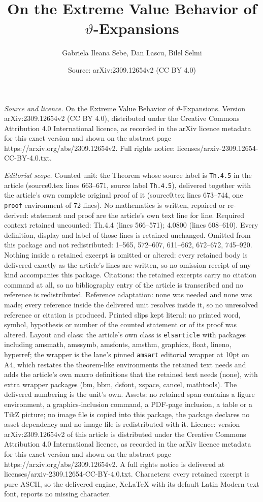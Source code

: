 \documentclass[10pt,a4paper]{amsart}
\title[On the Extreme Value Behavior of $\vartheta$-Expansions]{On the Extreme Value Behavior of $\vartheta$-Expansions}
\author{Gabriela Ileana Sebe, Dan Lascu, Bilel Selmi}
\date{Source: arXiv:2309.12654v2 (CC BY 4.0)}
\begin{document}
\maketitle

\noindent\emph{Source and licence.} On the Extreme Value Behavior of $\vartheta$-Expansions. Version arXiv:2309.12654v2 (CC BY 4.0), distributed under the Creative Commons Attribution 4.0 International licence, as recorded in the arXiv licence metadata for this exact version and shown on the abstract page https://arxiv.org/abs/2309.12654v2. Full rights notice: licenses/arxiv-2309.12654-CC-BY-4.0.txt.\par\smallskip

\noindent\textit{Editorial scope.} Counted unit: the Theorem whose source label is \texttt{Th.4.5} in the article (source0.tex lines 663--671, source label \texttt{Th.4.5}), delivered together with the article's own complete original proof of it (source0.tex lines 673--744, one \texttt{proof} environment of 72 lines). No mathematics is written, repaired or re-derived: statement and proof are the article's own text line for line. Required context retained uncounted: Th.4.4 (lines 566--571); 4.0800 (lines 608--610). Every definition, display and label of those lines is retained unchanged. Omitted from this package and not redistributed: 1--565, 572--607, 611--662, 672--672, 745--920. Nothing inside a retained excerpt is omitted or altered: every retained body is delivered exactly as the article's lines are written, so no omission receipt of any kind accompanies this package. Citations: the retained excerpts carry no citation command at all, so no bibliography entry of the article is transcribed and no reference is redistributed. Reference adaptation: none was needed and none was made; every reference inside the delivered unit resolves inside it, so no unresolved reference or citation is produced. Printed slips kept literal: no printed word, symbol, hypothesis or number of the counted statement or of its proof was altered. Layout and class: the article's own class is \texttt{elsarticle} with packages including amsmath, amssymb, amsfonts, amsthm, graphicx, float, lineno, hyperref; the wrapper is the lane's pinned \texttt{amsart} editorial wrapper at 10pt on A4, which restates the theorem-like environments the retained text needs and adds the article's own macro definitions that the retained text needs (none), with extra wrapper packages (bm, bbm, dsfont, xspace, cancel, mathtools). The delivered numbering is the unit's own. Assets: no retained span contains a figure environment, a graphics-inclusion command, a PDF-page inclusion, a table or a TikZ picture; no image file is copied into this package, the package declares no asset dependency and no image file is redistributed with it. Licence: version arXiv:2309.12654v2 of this article is distributed under the Creative Commons Attribution 4.0 International licence, as recorded in the arXiv licence metadata for this exact version and shown on the abstract page https://arxiv.org/abs/2309.12654v2. A full rights notice is delivered at licenses/arxiv-2309.12654-CC-BY-4.0.txt. Characters: every retained excerpt is pure ASCII, so the delivered engine, XeLaTeX with its default Latin Modern text font, reports no missing character.
\end{document}
